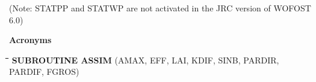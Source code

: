 \documentclass[11pt]{article}
\begin{document}
\bigskip
(Note: STATPP and STATWP are not activated in the JRC version of WOFOST 6.0)

\bigskip
\bigskip
\bigskip
\bigskip
{\bf {\large Acronyms}}

\nwln
\begin{tabbing}
\hspace{1.27cm}\=\hspace{1.27cm}\=\hspace{1.27cm}\=\hspace{1.27cm}\=%
\hspace{1.27cm}\=\hspace{1.27cm}\=\hspace{1.27cm}\=\hspace{1.27cm}\=%
\hspace{1.27cm}\=\hspace{1.27cm}\=\kill
{\bf SUBROUTINE ASSIM}\> \> \> (AMAX, EFF, LAI, KDIF, SINB, PARDIR, PARDIF, FGROS)
\end{tabbing}
\nwln
\end{document}
